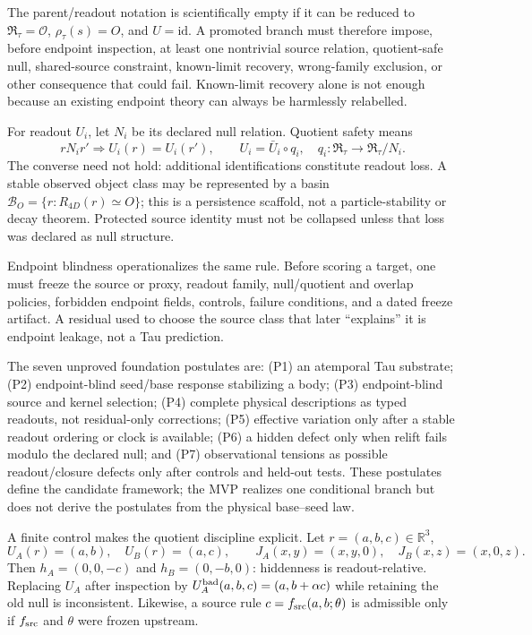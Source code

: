\documentclass[11pt]{article}
\newcommand{\RTspace}{\mathfrak R_{\tau}}
\newcommand{\Rmap}{\rho_{\tau}}
\newcommand{\Obs}{\mathcal O}
\begin{document}
The parent/readout notation is scientifically empty if it can be reduced to
\(\RTspace=\Obs\), \(\Rmap(s)=O\), and \(U=\mathrm{id}\).  A promoted branch
must therefore impose, before endpoint inspection, at least one nontrivial
source relation, quotient-safe null, shared-source constraint, known-limit
recovery, wrong-family exclusion, or other consequence that could fail.
Known-limit recovery alone is not enough because an existing endpoint theory
can always be harmlessly relabelled.

For readout \(U_i\), let \(N_i\) be its declared null relation.  Quotient
safety means
\begin{equation}
 rN_ir'\Longrightarrow U_i(r)=U_i(r'),
 \qquad
 U_i=\bar U_i\circ q_i,
 \quad q_i:\RTspace\to\RTspace/N_i.
 \label{eq:quotient-safe}
\end{equation}
The converse need not hold: additional identifications constitute readout
loss.  A stable observed object class may be represented by a basin
\(\mathcal B_O=\{r:R_{4D}(r)\simeq O\}\); this is a persistence scaffold, not
a particle-stability or decay theorem.  Protected source identity must not be
collapsed unless that loss was declared as null structure.

Endpoint blindness operationalizes the same rule.  Before scoring a target,
one must freeze the source or proxy, readout family, null/quotient and overlap
policies, forbidden endpoint fields, controls, failure conditions, and a dated
freeze artifact.  A residual used to choose the source class that later
``explains'' it is endpoint leakage, not a Tau prediction.

The seven unproved foundation postulates are: (P1) an atemporal Tau substrate;
(P2) endpoint-blind seed/base response stabilizing a body; (P3) endpoint-blind
source and kernel selection; (P4) complete physical descriptions as typed
readouts, not residual-only corrections; (P5) effective variation only after
a stable readout ordering or clock is available; (P6) a hidden defect only
when relift fails modulo the declared null; and (P7) observational tensions as
possible readout/closure defects only after controls and held-out tests.  These
postulates define the candidate framework; the MVP realizes one conditional
branch but does not derive the postulates from the physical base--seed law.

A finite control makes the quotient discipline explicit.  Let
\(r=(a,b,c)\in\mathbb R^3\),
\[
 U_A(r)=(a,b),\quad U_B(r)=(a,c),\qquad
 J_A(x,y)=(x,y,0),\quad J_B(x,z)=(x,0,z).
\]
Then \(h_A=(0,0,-c)\) and \(h_B=(0,-b,0)\): hiddenness is readout-relative.
Replacing \(U_A\) after inspection by
\(U_A^{\rm bad}(a,b,c)=(a,b+\alpha c)\) while retaining the old null is
inconsistent.  Likewise, a source rule \(c=f_{\rm src}(a,b;\theta)\) is
admissible only if \(f_{\rm src}\) and \(\theta\) were frozen upstream.
\end{document}
